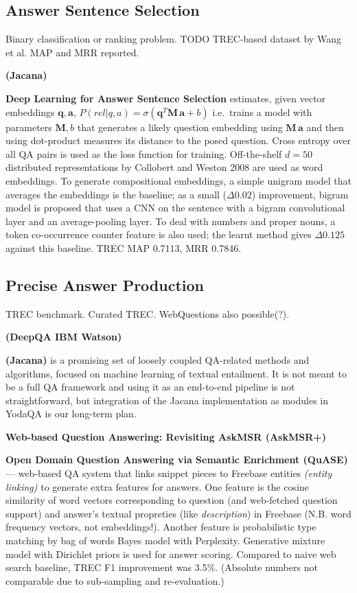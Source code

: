 \subsection{Answer Sentence Selection}
\label{sec:anssentsel}

Binary classification or ranking problem.
TODO TREC-based dataset by Wang et al.
MAP and MRR reported.

\textbf{(Jacana)} \citep{TreeEdit2013Yao}

\textbf{Deep Learning for Answer Sentence Selection} \citep{Yu2014Deep}
	estimates, given vector embeddings $\mathbf{q}, \mathbf{a}$,
	$P(rel|q,a) = \sigma(\mathbf{q}^T \mathbf{M}\, \mathbf{a} + b)$
	i.e.\ trains a model with parameters $\mathbf{M}, b$ that
	generates a likely question embedding using $\mathbf{M}\, \mathbf{a}$
	and then using dot-product measures its distance to the posed question.
	Cross entropy over all QA pairs is used as the loss function for training.
	Off-the-shelf $d=50$ distributed representations by Collobert and Weston 2008
	are used as word embeddings.
	To generate compositional embeddings,
	a simple unigram model that averages the embeddings is the baseline;
	as a small ($\Delta 0.02$) improvement, bigram model is proposed that uses a CNN
	on the sentence with a bigram convolutional layer and an average-pooling layer.
	To deal with numbers and proper nouns, a token co-occurrence counter
	feature is also used; the learnt method gives $\Delta 0.125$ against this baseline.
	TREC MAP 0.7113, MRR 0.7846.

\subsection{Precise Answer Production}

TREC benchmark.  Curated TREC.  WebQuestions also possible(?).

\textbf{(DeepQA IBM Watson)} \citep{WatsonOverview}

\textbf{(Jacana)} \citep{TreeEdit2013Yao} \citep{TreeEditIR2013Yao}
is a promising set of loosely coupled QA-related methods
and algorithms, focused on machine learning of textual entailment.  It is
not meant to be a full QA framework and using it as an end-to-end pipeline
is not straightforward, but integration of the Jacana implementation as
modules in YodaQA is our long-term plan.

\textbf{Web-based Question Answering: Revisiting AskMSR (AskMSR+)}

\textbf{Open Domain Question Answering via Semantic Enrichment (QuASE)} \citep{QuASE}
	--- web-based QA system that links snippet pieces to Freebase entities
	\textit{(entity linking)} to generate extra features for answers.
	One feature is the cosine similarity of word
	vectors corresponding to question (and web-fetched question support)
	and answer's textual propreties (like \textit{description}) in Freebase
	(N.B. word frequency vectors, not embeddings!).
	Another feature is probabilistic type matching by bag of words Bayes model
	with Perplexity.  Generative mixture model with Dirichlet priors is used
	for answer scoring.  Compared to naive web search baseline, TREC F1
	improvement was 3.5\%.  (Absolute numbers not comparable due to
	sub-sampling and re-evaluation.)

